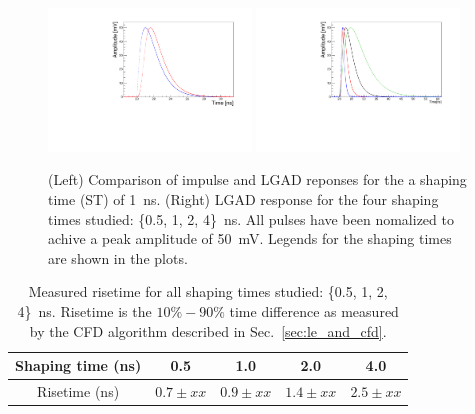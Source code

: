 \documentclass[preprint,1p]{elsarticle}
\begin{document}
\begin{figure}[htbp]
  \centering
  \includegraphics[width=0.48\textwidth]{figs/impulse_vs_lgad_response_1ens_shaping.pdf} \hfill
  \includegraphics[width=0.48\textwidth]{figs/lgad_all_shaping_time_noiseless.pdf}
  \caption{(Left) Comparison of impulse and LGAD reponses for the a shaping time (ST) of 1~\si{ns}.
  (Right) LGAD response for the four shaping times studied: \{0.5, 1, 2, 4\}~\si{ns}. All pulses have been nomalized
  to achive a peak amplitude of 50~\si{mV}. Legends for the shaping times are shown in the plots.}
  \label{fig:ir_and_lgad}
\end{figure}

\begin{table}[!htb]
\scriptsize
\begin{center}
  \begin{tabular}{ |c | c | c | c | c | }
    \hline
    Shaping time (ns) & 0.5         & 1.0         & 2.0         & 4.0 \\ \hline
    Risetime (ns)     & $0.7\pm xx$ & $0.9\pm xx$ & $1.4\pm xx$ & $2.5\pm xx$ \\
    \hline
  \end{tabular}
\caption{Measured risetime for all shaping times studied: \{0.5, 1, 2, 4\}~\si{ns}. Risetime is the $10\% - 90\%$ time
difference as measured by the CFD algorithm described in Sec.~\ref{sec:le_and_cfd}.}
\label{tab:sensors}
\end{center}
\end{table}
\end{document}
